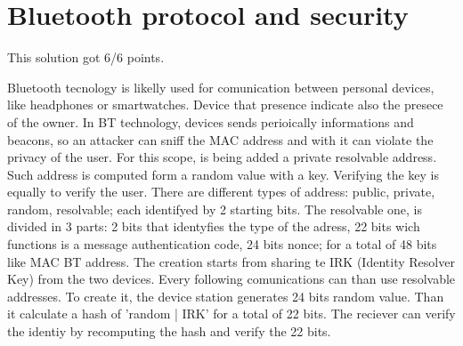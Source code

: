 \section{Bluetooth protocol and security}


\begin{solution}
    This solution got 6/6 points.
    
    Bluetooth tecnology is likelly used for comunication between personal devices, like headphones or smartwatches. Device that presence indicate also the presece of the owner. In BT technology, devices sends perioically informations and beacons, so an attacker can sniff the MAC address and with it can violate the privacy of the user. For this scope, is being added a private resolvable address. Such address is computed form a random value with a key. Verifying the key is equally to verify the user.
    There are different types of address: public, private, random, resolvable; each identifyed by 2 starting bits. The resolvable one, is divided in 3 parts: 2 bits that identyfies the type of the adress, 22 bits wich functions is a message authentication code, 24 bits nonce; for a total of 48 bits like MAC BT address.
    The creation starts from sharing te IRK (Identity Resolver Key) from the two devices. Every following comunications can than use resolvable addresses. To create it, the device station generates 24 bits random value. Than it calculate a hash of 'random | IRK' for a total of 22 bits. The reciever can verify the identiy by recomputing the hash and verify the 22 bits.
\end{solution}





